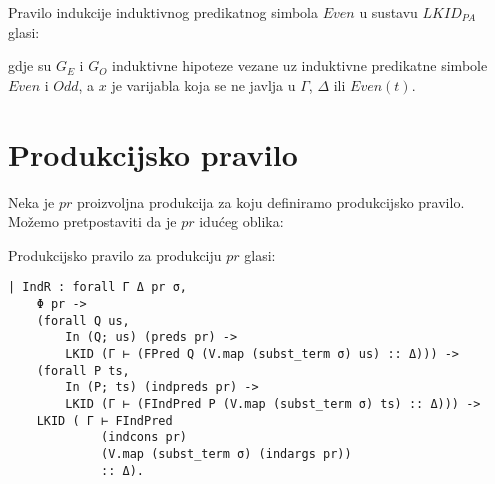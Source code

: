 \begin{example}
  Pravilo indukcije induktivnog predikatnog simbola  \(\mathit{Even}\)
  u sustavu \(\mathit{LKID}_{\mathit{PA}}\) glasi:
  \begin{small}
    \begin{prooftree}
    \end{prooftree}
  \end{small}
  \noindent gdje su \(G_{E}\) i \(G_{O}\) induktivne hipoteze vezane uz
  induktivne predikatne simbole \(\mathit{Even}\) i \(\mathit{Odd}\),
  a \(x\) je varijabla koja se ne javlja u \(\Gamma\), \(\Delta\) ili \(\mathit{Even}(t)\).
\end{example}

\section{Produkcijsko pravilo}
Neka je \(pr\) proizvoljna produkcija za koju definiramo produkcijsko pravilo.
Možemo pretpostaviti da je \(pr\) idućeg oblika:
\begin{prooftree}
\end{prooftree}
\noindent Produkcijsko pravilo za produkciju \(pr\) glasi:
\begin{prooftree}
\end{prooftree}
\begin{verbatim}
| IndR : forall Γ Δ pr σ,
    Φ pr ->
    (forall Q us,
        In (Q; us) (preds pr) ->
        LKID (Γ ⊢ (FPred Q (V.map (subst_term σ) us) :: Δ))) ->
    (forall P ts,
        In (P; ts) (indpreds pr) ->
        LKID (Γ ⊢ (FIndPred P (V.map (subst_term σ) ts) :: Δ))) ->
    LKID ( Γ ⊢ FIndPred
             (indcons pr)
             (V.map (subst_term σ) (indargs pr))
             :: Δ).
\end{verbatim}


